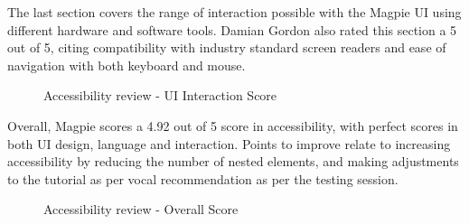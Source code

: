 \newpage
The last section covers the range of interaction possible with the Magpie UI using different hardware and software tools. Damian Gordon also rated this section a 5 out of 5, citing compatibility with industry standard screen readers and ease of navigation with both keyboard and mouse.
\begin{figure}
    \centering
    \caption{Accessibility review - UI Interaction Score}
\end{figure}
Overall, Magpie scores a 4.92 out of 5 score in accessibility, with perfect scores in both UI design, language and interaction. Points to improve relate to increasing accessibility by reducing the number of nested elements, and making adjustments to the tutorial as per vocal recommendation as per the testing session.
\begin{figure}
    \centering
    \caption{Accessibility review - Overall Score}
\end{figure}
